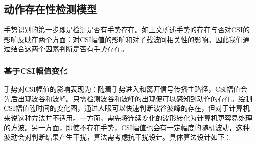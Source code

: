 \subsection{动作存在性检测模型}
手势识别的第一步即是检测是否有手势存在。如上文所述手势的存在与否对CSI的影响反映在两个方面：对CSI幅值的影响和对子载波间相关性的影响。因此我们通过结合这两个因素判断是否有手势存在。

\subsubsection{基于CSI幅值变化}
手势对CSI幅值的影响表现为：随着手势进入和离开信号传播主路径，CSI幅值会先后出现波谷和波峰。只需检测波谷和波峰的出现便可以感知到动作的存在。绘制CSI幅值随时间的变化图，通过人眼可以快速判断波谷波峰的存在，但对于计算机来说这种方法并不适用。一方面，需先将连续变化的波形转化为计算机更容易处理的方波。另一方面，即使不存在手势，CSI幅值也会有一定幅度的随机波动，这种波动会对判断结果产生干扰，算法需考虑抗干扰设计。具体算法设计如下：


